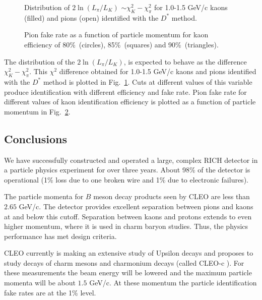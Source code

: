 \documentclass[fleqn,twoside]{article}
\begin{document}
\begin{figure} [htb]
\vspace{-1.3cm} \centerline{\epsfxsize
3.0in} \vspace{-.7cm}
\caption{\label{likelihood_ratio}
      Distribution of $2\ln\left(L_\pi/L_K\right)$ $\sim\chi^2_K-\chi^2_\pi$
      for 1.0-1.5 GeV/c kaons (filled)
      and pions (open) identified with the $D^*$ method.}
\vspace{-0.7cm}\end{figure}
\begin{figure} [hbt]
\vspace{.2cm} \centerline{\epsfxsize
2.8in} \vspace{-.7cm}
\caption{\label{id_vs_momentum}
      Pion fake rate as a function of particle momentum for
      kaon efficiency of 80\%\ (circles), 85\%\ (squares) and
      90\%\ (triangles).} \vspace{-0.7cm}\end{figure}

The distribution of the $2\ln\left(L_\pi/L_K\right)$, is expected
to behave as the difference $\chi^2_K-\chi^2_\pi$. This $\chi^2$
difference obtained for 1.0-1.5 GeV/c kaons and pions identified
with the $D^*$ method is plotted in Fig.~\ref{likelihood_ratio}.
Cuts at different values of this variable produce identification
with different efficiency and fake rate. Pion fake rate for
different values of kaon identification efficiency is plotted as a
function of particle momentum in Fig.~\ref{id_vs_momentum}.

\subsection{Conclusions}
We have successfully constructed and operated a large, complex
RICH detector in a particle physics experiment for over three
years. About 98\% of the detector is operational (1\% loss due to
one broken wire and 1\% due to electronic failures).

The particle momenta for $B$ meson decay products seen by CLEO are
less than $2.65$ GeV/c. The detector provides excellent separation
between pions and kaons at and below this cutoff. Separation
between kaons and protons extends to even higher momentum, where
it is used in charm baryon studies. Thus, the physics performance
has met design criteria.

CLEO currently is making an extensive study of Upsilon decays and
proposes to study decays of charm mesons and charmonium decays
(called CLEO-c \cite{CLEO-c}). For these measurements the beam
energy will be lowered and the maximum particle momenta will be
about $1.5$ GeV/c. At these momentum the particle identification
fake rates are at the 1\% level.
\end{document}
